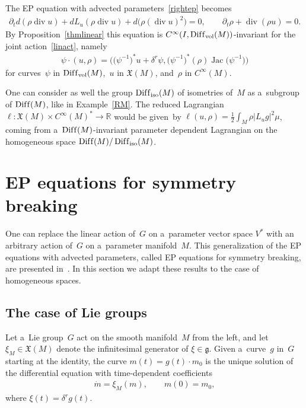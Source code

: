 \documentclass[pdftex]{sigma}
\numberwithin{equation}{section}
\begin{document}
\begin{Example}
The EP equation with advected parameters~\eqref{rightep} becomes
\begin{gather*}
\partial_t d(\rho\operatorname{div} u)+d L_u (\rho\operatorname{div} u)+ d\big(\rho(\operatorname{div} u)^2\big)=0,
\qquad
\partial_t\rho+\operatorname{div}(\rho u)=0.
\end{gather*}
By Proposition~\ref{thmlinear} this equation   is $C^{\infty}(I,\operatorname{Dif\/f}_{\operatorname{vol}}(M))$-invariant
for the joint action~\eqref{linact}, namely
\begin{gather*}
\psi\cdot(u,\rho)=\big(\big(\psi^{-1}\big)^* u+\delta^r\psi,\big(\psi^{-1}\big)^*(\rho)\operatorname{Jac}\big(\psi^{-1}\big)\big)
\end{gather*}
for curves~$\psi$ in $\operatorname{Dif\/f}_{\operatorname{vol}}(M)$,~$u$ in $\mathfrak X(M)$, and~$\rho$ in
$C^{\infty}(M)$.
\end{Example}

\begin{Example}
One can consider as well the group $\operatorname{Dif\/f}_{\operatorname{iso}}(M)$ of isometries of~$M$ as a~subgroup of
$\operatorname{Dif\/f}(M)$, like in Example~\ref{RM}.
The reduced Lagrangian $\ell:\mathfrak X(M)\times C^{\infty}(M)^*\to\mathbb R$ would be given~by
$\ell(u,\rho)=\frac12\int_M\rho|L_ug|^2\mu$, coming from a~$\operatorname{Dif\/f}(M)$-invariant parameter dependent
Lagrangian on the homogeneous space $\operatorname{Dif\/f}(M)/\operatorname{Dif\/f}_{\operatorname{iso}}(M)$.
\end{Example}

\section{EP equations for symmetry breaking}
\label{s5}

One can replace the linear action of~$G$ on a~parameter vector space $V^*$ with an arbitrary action of~$G$ on
a~parameter manifold~$M$.
This generalization of the EP equations with advected parameters, called EP equations for symmetry breaking, are
presented in~\cite{GBT}.
In this section we adapt these results to the case of homogeneous spaces.

\subsection{The case of Lie groups}

Let a~Lie group~$G$ act on the smooth manifold~$M$ from the left, and let $\xi_M\in\mathfrak X(M)$ denote the
inf\/initesimal generator of $\xi\in\mathfrak g$.
Given a~curve~$g$ in~$G$ starting at the identity, the curve $m(t)=g(t)\cdot m_0$ is the unique solution of the
dif\/ferential equation with time-dependent coef\/f\/icients
\begin{gather*}
\dot{m}=\xi_M(m),
\qquad
m(0)=m_0,
\end{gather*}
where $\xi(t)=\delta^rg(t)$.
\end{document}
